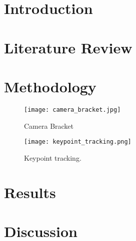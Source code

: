\begin{abstract}
\lipsum[1]
\end{abstract}

\section{Introduction}
\lipsum[1]

\section{Literature Review}
\lipsum[1]

\section{Methodology}
\lipsum[1]
\begin{figure}
  \centering
  \texttt{[image: camera\_bracket.jpg]}
  \caption{Camera Bracket}
  \label{fig:camera_bracket}
\end{figure}

\lipsum[1]
\begin{figure}
  \centering
  \texttt{[image: keypoint\_tracking.png]}
  \caption{Keypoint tracking.}
  \label{fig:keypoint_tracking}
\end{figure}

\section{Results}
\lipsum[1]
\section{Discussion}
\lipsum[1]
